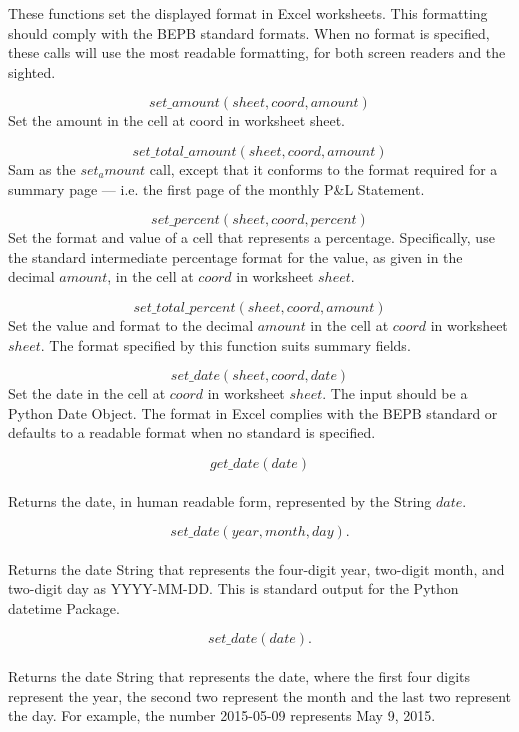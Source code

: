 \documentclass[12pt]{article}
\begin{document}
These functions set the displayed format in Excel worksheets.  This
formatting should comply with the BEPB standard formats.  When no
format is specified, these calls will use the most readable
formatting, for both screen readers and the sighted.

\[ set\_amount(sheet, coord, amount) \]
\noindent Set the amount in the cell at coord in worksheet sheet.

\[ set\_total\_amount(sheet, coord, amount) \]
\noindent Sam as the $set_amount$ call, except that it conforms to the
format required for a summary page --- i.e. the first page of the
monthly P\&L Statement.

\[ set\_percent(sheet, coord, percent) \]
\noindent Set the format and value of a cell that represents a
percentage.  Specifically, use the standard intermediate percentage
format for the value, as given in the decimal $amount$, in the cell at
$coord$ in worksheet $sheet$.

\[ set\_total\_percent(sheet, coord, amount) \]
\noindent Set the value and format to the decimal $amount$ in the cell
at $coord$ in worksheet
$sheet$.  The format specified by this function suits summary fields.

\[ set\_date(sheet, coord, date) \]
\noindent Set the date in the cell at $coord$
in worksheet $sheet$.
The input should be a Python Date Object.  The format in Excel
complies with the BEPB standard or defaults to a readable format when
no standard is specified.

\[ get\_date(date) \] \\
\noindent Returns the date, in human readable form, represented by the
String $date$.

\[ set\_date(year, month, day) . \] \\
\noindent Returns the date String that represents the four-digit year,
two-digit month, and two-digit day as YYYY-MM-DD.  This is standard
output for the Python datetime Package.

\[ set\_date(date) . \] \\
\noindent Returns the date String that represents the date, where the first four digits represent the year, the second two represent the month and the last two represent the day.  For example, the number 2015-05-09 represents May 9, 2015.
\end{document}
